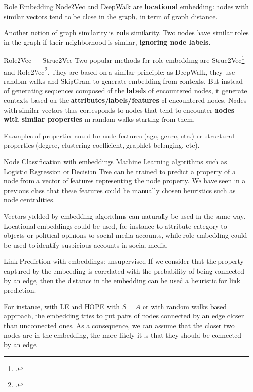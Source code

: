\documentclass[a4paper,11pt]{book}
\begin{document}
\begin{textbox}{Role Embedding}
Node2Vec and DeepWalk are \textbf{locational} embedding: nodes with similar vectors tend to be close in the graph, in term of graph distance.

Another notion of graph similarity is \textbf{role} similarity. Two nodes have similar roles in the graph if their neighborhood is similar, \textbf{ignoring node labels}. 
\end{textbox}



\begin{textbox}{Role2Vec — Struc2Vec}
Two popular methods for role embedding are Struc2Vec\footcite{ribeiro2017struc2vec} and Role2Vec\footcite{ahmed2019role2vec}. They are based on a similar principle: as DeepWalk, they use random walks and SkipGram to generate embedding from contexts. But instead of generating sequences composed of the \textbf{labels} of encountered nodes, it generate contexts based on the \textbf{attributes/labels/features} of encountered nodes. Nodes with similar vectors thus corresponds to nodes that tend to encounter \textbf{nodes with similar properties} in random walks starting from them.

Examples of properties could be node features (age, genre, etc.) or structural properties (degree, clustering coefficient, graphlet belonging, etc).
\end{textbox}



\begin{textbox}{Node Classification with embeddings}
Machine Learning algorithms such as Logistic Regression or Decision Tree can be trained to predict a property of a node from a vector of features representing the node property. We have seen in a previous class that these features could be manually chosen heuristics such as node centralities. 

Vectors yielded by embedding algorithms can naturally be used in the same way. Locational embeddings could be used, for instance to attribute category to objects or political opinions to social media accounts, while role embedding could be used to identify suspicious accounts in social media.
\end{textbox}



\begin{textbox}{Link Prediction with embeddings: unsupervised}
If we consider that the property captured by the embedding is correlated with the probability of being connected by an edge, then the distance in the embedding can be used a heuristic for link prediction. 

For instance, with LE and HOPE with $S=A$ or with random walks based approach, the embedding tries to put pairs of nodes connected by an edge closer than unconnected ones. As a consequence, we can assume that the closer two nodes are in the embedding, the more likely it is that they should be connected by an edge.
\end{textbox}
\end{document}
